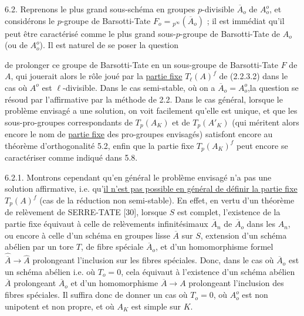 6.2. Reprenons le plus grand sous-schéma en groupes $p$-divisible $\overline{A}_o$ de $A_o^o$, et considérons le $p$-groupe de Barsotti-Tate $F_o = {}_{p^\infty}(\overline{A}_o)$ ; il est immédiat qu'il peut être caractérisé comme le plus grand sous-$p$-groupe de Barsotti-Tate de $A_o$ (ou de $A_o^o$). Il est naturel de se poser la question



de prolonger ce groupe de Barsotti-Tate en un sous-groupe de Barsotti-Tate $F$ de $A$, qui jouerait alors le rôle joué par la \underline{partie fixe} $T_\ell(A)^f$ de (2.2.3.2) dans le cas où $A^o$ est $\ell$-divisible. Dans le cas semi-stable, où on a $\overline{A}_o = A_o^o$,la question se résoud par l'affirmative par la méthode de 2.2. Dans le cas général, lorsque le problème envisagé a une solution, on voit facilement qu'elle est unique, et que les sous-pro-groupes correspondants de $T_p(A_K)$ et de $T_p(A'_K)$ (qui méritent alors encore le nom de \underline{partie fixe} des pro-groupes envisagés) satisfont encore au théorème d'orthogonalité 5.2, enfin que la partie fixe $T_p(A_K)^f$ peut encore se caractériser comme indiqué dans 5.8.

6.2.1. Montrons cependant qu'en général le problème envisagé n'a pas une solution affirmative, i.e. qu'\underline{il n'est pas possible en général de définir la partie fixe} $T_p(A)^f$ (cas de la réduction non semi-stable). En effet, en vertu d'un théorème de relèvement de SERRE-TATE [30], lorsque $S$ est complet, l'existence de la partie fixe équivaut à celle de relèvements infinitésimaux $\overline{A}_n$ de $\overline{A}_o$ dans les $A_n$, ou encore à celle d'un schéma en groupes lisse $\overline{A}$ sur $S$, extension d'un schéma abélien par un tore $T$, de fibre spéciale $\overline{A}_o$, et d'un homomorphisme formel $\widehat{\overline{A}} \longrightarrow \widehat{A}$ prolongeant l'inclusion sur les fibres spéciales. Donc, dans le cas où $\overline{A}_o$ est un schéma abélien i.e. où $T_o = 0$, cela équivaut à l'existence d'un schéma abélien $\overline{A}$ prolongeant $\overline{A}_o$ et d'un homomorphisme $\overline{A} \longrightarrow A$ prolongeant l'inclusion des fibres spéciales. Il suffira donc de donner un cas où $T_o = 0$, où $A_o^o$ est non unipotent et non propre, et où $A_K$ est simple sur $K$.



